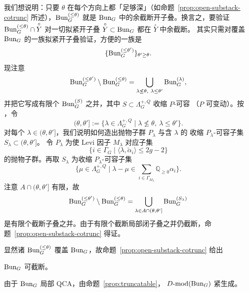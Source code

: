 我们想说明：只要 $\theta$ 在每个方向上都「足够深」（如命题~\ref{prop:open-substack-cotrunc}
所述），$\mathrm{Bun}^{(\le\theta)}_G$ 就是 $\mathrm{Bun}_G$ 中的余截断开子叠。换言之，要验证
$\mathrm{Bun}^{(\le\theta)}_G\cap \overset{\circ}{Y}$ 对一切拟紧开子叠
$\overset{\circ}{Y}\subset \mathrm{Bun}_G$ 都在 $\overset{\circ}{Y}$ 中余截断。
其实只需对覆盖 $\mathrm{Bun}_G$ 的一族拟紧开子叠验证，方便的一族是
\[
\{\mathrm{Bun}^{(\le\theta')}_G\}_{\theta'\ge \theta}.
\]
现注意
\[
\mathrm{Bun}^{(\le\theta')}_G\setminus \mathrm{Bun}^{(\le\theta)}_G
=\bigcup_{\lambda\not\le \theta,\ \lambda\le \theta'}\mathrm{Bun}^{(\lambda)}_G,
\]
并把它写成有限个 $\mathrm{Bun}^{(S)}_G$ 之并，其中 $S\subset \Lambda^{+,Q}_G$ 收缩 $P$-可容
（$P$ 可变动）。按 \cite[9.3.2]{DG15}，令
\[
(\theta,\theta']:=\{\lambda\in \Lambda^{+,Q}_G\mid \lambda\not\le \theta,\ \lambda\le \theta'\}.
\]
对每个 $\lambda\in(\theta,\theta']$，我们说明如何造出抛物子群 $P_\lambda$ 与含 $\lambda$ 的
收缩 $P_\lambda$-可容子集 $S_\lambda\subset(\theta,\theta']$。
令 $P_\lambda$ 为使 Levi 因子 $M_\lambda$ 对应子集
\[
\{i\in \Gamma_G\mid \langle\lambda,\check\alpha_i\rangle\le 2g-2\}
\]
的抛物子群。再取 $S_\lambda$ 为收缩 $P_\lambda$-可容子集
\[
\{\mu\in \Lambda^{+,Q}_G\mid \lambda-\mu\in \sum_{i\in \Gamma_{M_\lambda}}\mathbb{Q}_{\ge 0}\alpha_i\}.
\]
注意 $A\cap(\theta,\theta']$ 有限，故
\[
\mathrm{Bun}^{(\le\theta')}_G\setminus \mathrm{Bun}^{(\le\theta)}_G
=\bigcup_{\lambda\in A\cap(\theta,\theta']}\mathrm{Bun}^{(S_\lambda)}_G
\]
是有限个截断子叠之并。由于有限个截断局部闭子叠之并仍截断，命题~\ref{prop:open-substack-cotrunc}
得证。

显然诸 $\mathrm{Bun}^{(\le\theta)}_G$ 覆盖 $\mathrm{Bun}_G$，故命题~\ref{prop:open-substack-cotrunc} 给出

\begin{proposition}
\label{prop:bun-truncatable}
$\mathrm{Bun}_G$ 可截断。
\end{proposition}

由于 $\mathrm{Bun}_G$ 局部 QCA，由命题~\ref{prop:truncatable}，
$D\text{-}\mathrm{mod}(\mathrm{Bun}_G)$ 紧生成。
